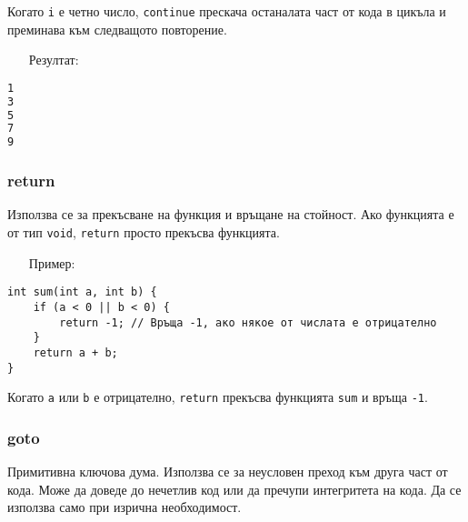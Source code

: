 \documentclass[oneside]{book}
\newcommand*{\code}[1]{\texttt{#1}}
\begin{document}
Когато \code{i} е четно число, \code{continue} прескача останалата част от кода в цикъла и преминава към следващото повторение.
\pagebreak
\begin{itemize}\item[Резултат:]\end{itemize}
\begin{mdframed}\begin{lstlisting}[language=bash]
1
3
5
7
9
\end{lstlisting}\end{mdframed}

\subsubsection{return}
Използва се за прекъсване на функция и връщане на стойност. Ако функцията е от тип \code{void}, \code{return} просто прекъсва функцията.

\begin{itemize}\item[Пример:]\end{itemize}
\begin{mdframed}\begin{lstlisting}
int sum(int a, int b) {
    if (a < 0 || b < 0) {
        return -1; // Връща -1, ако някое от числата е отрицателно
    }
    return a + b;
}
\end{lstlisting}\end{mdframed}

Когато \code{a} или \code{b} е отрицателно, \code{return} прекъсва функцията \code{sum} и връща \code{-1}.

\subsubsection{goto}
Примитивна ключова дума. Използва се за неусловен преход към друга част от кода. Може да доведе до нечетлив код или да пречупи интегритета на кода. Да се използва само при изрична необходимост.
\end{document}
